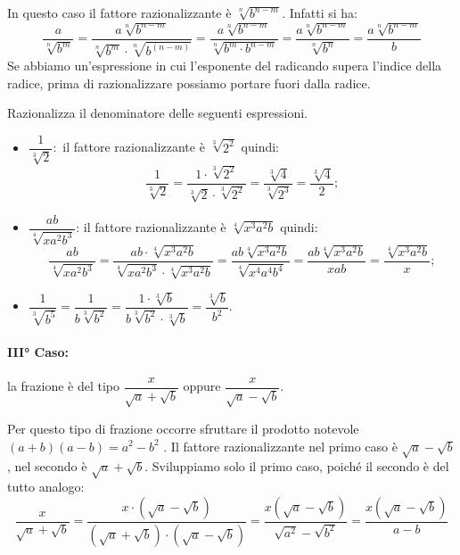 In questo caso il fattore razionalizzante è \(\sqrt[n]{b^{n-m}}\). Infatti si ha:
\begin{equation*}
\dfrac a{\sqrt[n]{b^m}}=
\dfrac{a\sqrt[n]{b^{n-m}}}{\sqrt[n]{b^m}\cdot \sqrt[n]{b^{(n-m)}}}=
\dfrac{a\sqrt[n]{b^{n-m}}}{\sqrt[n]{b^m\cdot b^{n-m}}}=
\dfrac{a\sqrt[n]{b^{n-m}}}{\sqrt[n]{b^n}}=\dfrac{a\sqrt[n]{b^{n-m}}} b
\end{equation*}
Se abbiamo un'espressione in cui l'esponente del radicando supera l'indice 
della radice, prima di razionalizzare possiamo portare fuori dalla radice.

\begin{exrig}
 \begin{esempio}
Razionalizza il denominatore delle seguenti espressioni.
\begin{itemize}
 \item \(\dfrac 1{\sqrt[3]2}\):\, il fattore razionalizzante è \(\sqrt[3]{2^2}\) 
  quindi:
  \[\dfrac 1{\sqrt[3]2}=
  \dfrac{1\cdot \sqrt[3]{2^2}}{\sqrt[3]2\cdot \sqrt[3]{2^2}}=
  \dfrac{\sqrt[3]4}{\sqrt[3]{2^3}}=\dfrac{\sqrt[3]4} 2;\]
 \item \(\dfrac{ab}{\sqrt[4]{xa^2b^3}}\):
 il fattore razionalizzante è \(\sqrt[4]{x^3a^2b}\)
 quindi: 
 \[\dfrac{ab}{\sqrt[4]{xa^2b^3}}=
 \dfrac{ab\cdot \sqrt[4]{x^3a^2b}}{\sqrt[4]{xa^2b^3}\cdot \sqrt[4]{x^3a^2b}}=
 \dfrac{ab\sqrt[4]{x^3a^2b}}{\sqrt[4]{x^4a^4b^4}}=
 \dfrac{ab\sqrt[4]{x^3a^2b}}{xab}=\dfrac{\sqrt[4]{x^3a^2b}} x;\]
 \item \(\dfrac 1{\sqrt[3]{b^5}}=\dfrac 1{b\sqrt[3]{b^2}}=
        \dfrac{1\cdot \sqrt[3]b}{b\sqrt[3]{b^2}\cdot \sqrt[3]b}=
        \dfrac{\sqrt[3]b}{b^2}\).
\end{itemize}
 \end{esempio}
\end{exrig}


\paragraph{III° Caso:} 
la frazione è del tipo \(\dfrac x{\sqrt a+\sqrt b}\) 
oppure \(\dfrac x{\sqrt a-\sqrt b}\).

Per questo tipo di frazione occorre sfruttare il prodotto notevole 
\((a+b)(a-b)=a^2-b^2\) . Il fattore razionalizzante nel primo caso è \(\sqrt a-\sqrt b\), nel secondo è \(\sqrt a+\sqrt b\).
Sviluppiamo solo il primo caso, poiché il secondo è del tutto analogo:
\begin{equation*}
\dfrac x{\sqrt a+\sqrt b}=
\dfrac{x\cdot (\sqrt a-\sqrt b)}{(\sqrt a+\sqrt b)\cdot (\sqrt a-\sqrt b)}=
\dfrac{x(\sqrt a-\sqrt b)}{\sqrt{a^2}-\sqrt{b^2}}=
\dfrac{x(\sqrt a-\sqrt b)}{a-b}
\end{equation*}

